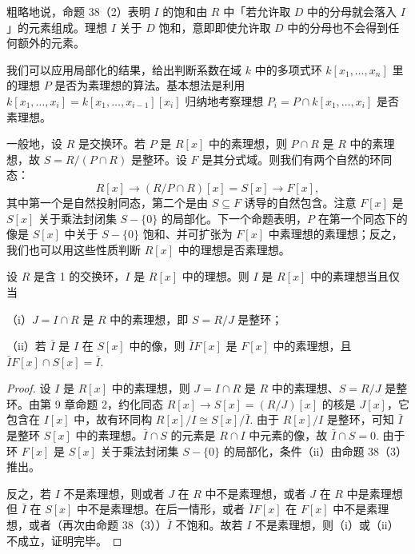 粗略地说，命题 38（2）表明 \(I\) 的饱和由 \(R\) 中「若允许取 \(D\) 中的分母就会落入 \(I\)」的元素组成。理想 \(I\) 关于 \(D\) 饱和，意即即使允许取 \(D\) 中的分母也不会得到任何额外的元素。

我们可以应用局部化的结果，给出判断系数在域 \(k\) 中的多项式环 \(k[x_1, \ldots, x_n]\) 里的理想 \(P\) 是否为素理想的算法。基本想法是利用 \(k[x_1, \ldots, x_i] = k[x_1, \ldots, x_{i-1}][x_i]\) 归纳地考察理想 \(P_i = P \cap k[x_1, \ldots, x_i]\) 是否素理想。

一般地，设 \(R\) 是交换环。若 \(P\) 是 \(R[x]\) 中的素理想，则 \(P \cap R\) 是 \(R\) 中的素理想，故 \(S = R/(P \cap R)\) 是整环。设 \(F\) 是其分式域。则我们有两个自然的环同态：
\[
R[x] \to (R/P \cap R)[x] = S[x] \to F[x],
\]
其中第一个是自然投射同态，第二个是由 \(S \subseteq F\) 诱导的自然包含。注意 \(F[x]\) 是 \(S[x]\) 关于乘法封闭集 \(S-\{0\}\) 的局部化。下一个命题表明，\(P\) 在第一个同态下的像是 \(S[x]\) 中关于 \(S-\{0\}\) 饱和、并可扩张为 \(F[x]\) 中素理想的素理想；反之，我们也可以用这些性质判断 \(R[x]\) 中的理想是否素理想。

\begin{proposition}\label{pro:15.39}
设 \(R\) 是含 1 的交换环，\(I\) 是 \(R[x]\) 中的理想。则 \(I\) 是 \(R[x]\) 中的素理想当且仅当

（i）\(J = I \cap R\) 是 \(R\) 中的素理想，即 \(S = R/J\) 是整环；

（ii）若 \(\bar I\) 是 \(I\) 在 \(S[x]\) 中的像，则 \(\bar IF[x]\) 是 \(F[x]\) 中的素理想，且 \(\bar IF[x] \cap S[x] = \bar I\).
\end{proposition}

\begin{proof}
设 \(I\) 是 \(R[x]\) 中的素理想，则 \(J = I \cap R\) 是 \(R\) 中的素理想、\(S = R/J\) 是整环。由第 9 章命题 2，约化同态 \(R[x] \to S[x] = (R/J)[x]\) 的核是 \(J[x]\)，它包含在 \(I[x]\) 中，故有环同构 \(R[x]/I \cong S[x]/\bar I\). 由于 \(R[x]/I\) 是整环，可知 \(\bar I\) 是整环 \(S[x]\) 中的素理想。\(\bar I \cap S\) 的元素是 \(R \cap I\) 中元素的像，故 \(\bar I \cap S = 0\). 由于环 \(F[x]\) 是 \(S[x]\) 关于乘法封闭集 \(S-\{0\}\) 的局部化，条件（ii）由命题 38（3）推出。

反之，若 \(I\) 不是素理想，则或者 \(J\) 在 \(R\) 中不是素理想，或者 \(J\) 在 \(R\) 中是素理想但 \(\bar I\) 在 \(S[x]\) 中不是素理想。在后一情形，或者 \(\bar IF[x]\) 在 \(F[x]\) 中不是素理想，或者（再次由命题 38（3））\(\bar I\) 不饱和。故若 \(I\) 不是素理想，则（i）或（ii）不成立，证明完毕。
\end{proof}

